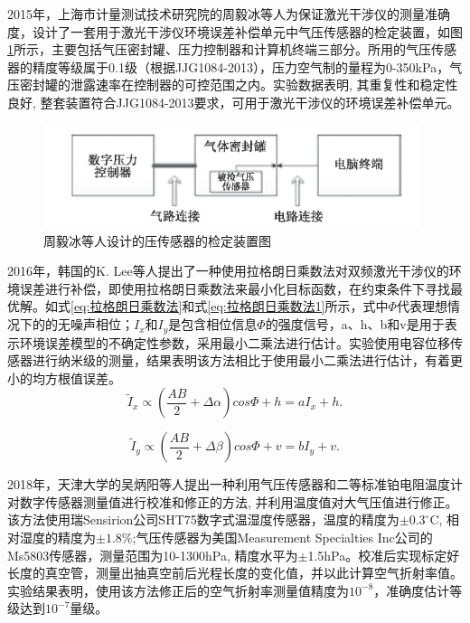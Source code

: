 2015年，上海市计量测试技术研究院的周毅冰等人为保证激光干涉仪的测量准确度，设计了一套用于激光干涉仪环境误差补偿单元中气压传感器的检定装置，如图\ref{fig:周毅冰等人设计的压传感器的检定装置图}所示\cite{周毅冰2015激光干涉仪环境补偿单元气压传感器检定装置}，主要包括气压密封罐、压力控制器和计算机终端三部分。所用的气压传感器的精度等级属于0.1级（根据JJG1084-2013），压力空气制的量程为0-350kPa，气压密封罐的泄露速率在控制器的可控范围之内。实验数据表明, 其重复性和稳定性良好, 整套装置符合JJG1084-2013要求，可用于激光干涉仪的环境误差补偿单元。
\begin{figure}[htb]
  \centering
  \includegraphics[width=11cm]{fig/1-fig/周毅冰等人设计的压传感器的检定装置图.jpg}
  \caption{周毅冰等人设计的压传感器的检定装置图}
  \label{fig:周毅冰等人设计的压传感器的检定装置图}
\end{figure}

2016年，韩国的K. Lee等人提出了一种使用拉格朗日乘数法对双频激光干涉仪的环境误差进行补偿，即使用拉格朗日乘数法来最小化目标函数，在约束条件下寻找最优解。如式\eqref{eq:拉格朗日乘数法}和式\eqref{eq:拉格朗日乘数法1}所示\cite{2016Lagrange}，式中$\Phi$代表理想情况下的的无噪声相位；$I_{x}$和$I_{y}$是包含相位信息$\Phi$的强度信号，a、h、b和v是用于表示环境误差模型的不确定性参数，采用最小二乘法进行估计。实验使用电容位移传感器进行纳米级的测量，结果表明该方法相比于使用最小二乘法进行估计，有着更小的均方根值误差。
\begin{equation}\label{eq:拉格朗日乘数法}
  \tilde{I}_{x} \propto (\frac{AB}{2} + \Delta \alpha)cos \Phi + h = aI_{x} + h.
\end{equation}

\begin{equation}\label{eq:拉格朗日乘数法1}
  \tilde{I}_{y} \propto (\frac{AB}{2} + \Delta \beta) cos \Phi + v = bI_{y} + v.
\end{equation}

2018年，天津大学的吴炳阳等人提出一种利用气压传感器和二等标准铂电阻温度计对数字传感器测量值进行校准和修正的方法, 并利用温度值对大气压值进行修正\cite{吴炳阳2018小型化空气折射率测量装置的精度修正}。该方法使用瑞Sensirion公司SHT75数字式温湿度传感器，温度的精度为$\pm0.3^{\circ}\mathrm{C}$, 相对湿度的精度为$\pm1.8\%$;气压传感器为美国Measurement Specialties Inc公司的Ms5803传感器，测量范围为10-1300hPa, 精度水平为$\pm$1.5hPa。校准后实现标定好长度的真空管，测量出抽真空前后光程长度的变化值，并以此计算空气折射率值。实验结果表明，使用该方法修正后的空气折射率测量值精度为$10^{-8}$，准确度估计等级达到$10^{-7}$量级。


